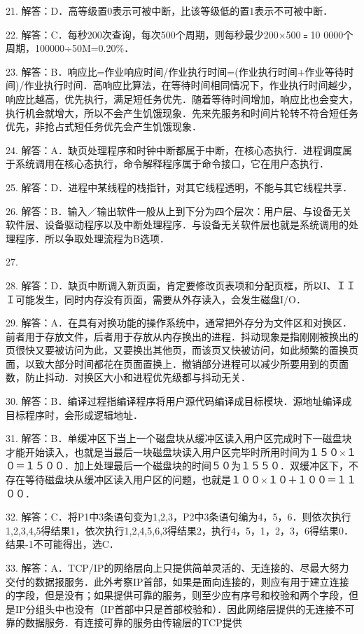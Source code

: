 21. 解答：D．高等级置0表示可被中断，比该等级低的置1表示不可被中断．

22. 解答：C．每秒200次查询，每次500个周期，则每秒最少200×500﹦10 0000个周期，100000÷50M=0.20\%．

23. 解答：B．响应比=作业响应时间/作业执行时间=(作业执行时间+作业等待时间)/作业执行时间．高响应比算法，在等待时间相同情况下，作业执行时间越少，响应比越高，优先执行，满足短任务优先．随着等待时间增加，响应比也会变大，执行机会就增大，所以不会产生饥饿现象．先来先服务和时间片轮转不符合短任务优先，非抢占式短任务优先会产生饥饿现象．

24. 解答：A．缺页处理程序和时钟中断都属于中断，在核心态执行．进程调度属于系统调用在核心态执行，命令解释程序属于命令接口，它在用户态执行．

25. 解答：D．进程中某线程的栈指针，对其它线程透明，不能与其它线程共享．

26. 解答：B．输入／输出软件一般从上到下分为四个层次：用户层、与设备无关软件层、设备驱动程序以及中断处理程序．与设备无关软件层也就是系统调用的处理程序．所以争取处理流程为B选项．

27. 

28. 解答：D．缺页中断调入新页面，肯定要修改页表项和分配页框，所以I、ＩＩＩ可能发生，同时内存没有页面，需要从外存读入，会发生磁盘I/O．

29. 解答：A．在具有对换功能的操作系统中，通常把外存分为文件区和对换区．前者用于存放文件，后者用于存放从内存换出的进程．抖动现象是指刚刚被换出的页很快又要被访问为此，又要换出其他页，而该页又快被访问，如此频繁的置换页面，以致大部分时间都花在页面置换上．撤销部分进程可以减少所要用到的页面数，防止抖动．对换区大小和进程优先级都与抖动无关．

30. 解答：B．编译过程指编译程序将用户源代码编译成目标模块．源地址编译成目标程序时，会形成逻辑地址．

31. 解答：B．单缓冲区下当上一个磁盘块从缓冲区读入用户区完成时下一磁盘块才能开始读入，也就是当最后一块磁盘块读入用户区完毕时所用时间为１５０×１０＝１５００．加上处理最后一个磁盘块的时间５０为１５５０．双缓冲区下，不存在等待磁盘块从缓冲区读入用户区的问题，也就是１００×１０＋１００＝１１００．

32. 解答：C．将P1中3条语句变为1,2,3，P2中3条语句编为4，5，6．则依次执行1,2,3,4,5得结果1，依次执行1,2,4,5,6,3得结果2，执行4，5，1，2，3，6得结果0．结果-1不可能得出，选C．

33. 解答：A．TCP/IP的网络层向上只提供简单灵活的、无连接的、尽最大努力交付的数据报服务．此外考察IP首部，如果是面向连接的，则应有用于建立连接的字段，但是没有；如果提供可靠的服务，则至少应有序号和校验和两个字段，但是IP分组头中也没有（IP首部中只是首部校验和）．因此网络层提供的无连接不可靠的数据服务．有连接可靠的服务由传输层的TCP提供


